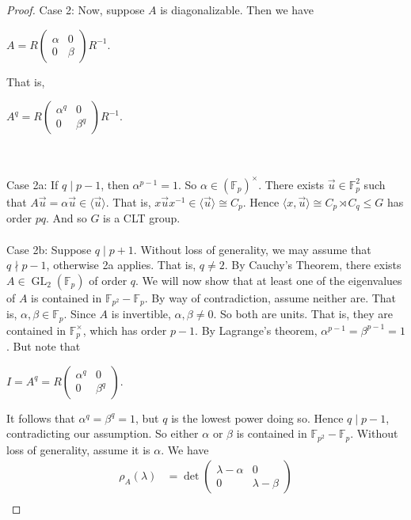 \documentclass[12pt]{report}
\theoremstyle{newthm}
\DeclareMathOperator{\GL}{GL}
\begin{document}
\begin{proof}
Case 2: Now, suppose $A$ is diagonalizable.\; Then we have \begin{center}$A=R\begin{pmatrix}\alpha & 0\\ 0 & \beta\end{pmatrix}R^{-1}$.\end{center} That is,\begin{center} $A^q = R\begin{pmatrix}\alpha^q & 0\\ 0 & \beta^q\end{pmatrix}R^{-1}$.\end{center}\\~\\
Case 2a: If $q\mid p-1$, then $\alpha^{p-1}=1$. So $\alpha\in (\mathbb{F}_p)^\times$. There exists $\Vec{u}\in\mathbb{F}_p^2$ such that $A\Vec{u}=\alpha\Vec{u}\in\langle\Vec{u}\rangle$. That is, $x\Vec{u}x^{-1}\in\langle\Vec{u}\rangle\cong C_p$. Hence $\langle x, \Vec{u}\rangle \cong C_p\rtimes C_q\leq G$ has order $pq$. And so $G$ is a CLT group. \\~\\
Case 2b: Suppose $q\mid p+1$. Without loss of generality, we may assume that $q\nmid p-1$, otherwise 2a applies. That is, $q\neq 2$. By Cauchy's Theorem, there exists $A\in \GL_2(\mathbb{F}_p)$ of order $q$. We will now show that at least one of the eigenvalues of $A$ is contained in $\mathbb{F}_{p^2}-\mathbb{F}_p$. By way of contradiction, assume neither are. That is, $\alpha,\beta\in\mathbb{F}_p$. Since $A$ is invertible, $\alpha,\beta\neq 0$. So both are units. That is, they are contained in $\mathbb{F}_p^\times$, which has order $p-1$. By Lagrange's theorem, $\alpha^{p-1}=\beta^{p-1}=1$. But note that \begin{center} $I=A^q=R\begin{pmatrix}\alpha^q & 0 \\ 0 & \beta^q\end{pmatrix}$.\end{center}
It follows that $\alpha^q=\beta^q=1$, but $q$ is the lowest power doing so. Hence $q\mid p-1$, contradicting our assumption. So either $\alpha $ or $\beta$ is contained in $\mathbb{F}_{p^2}-\mathbb{F}_p$. Without loss of generality, assume it is $\alpha$. We have \begin{align*}
    \rho_A(\lambda) &= \det\begin{pmatrix} \lambda - \alpha & 0 \\ 0 & \lambda - \beta \end{pmatrix} \\

\end{align*}
\end{proof}
\end{document}
